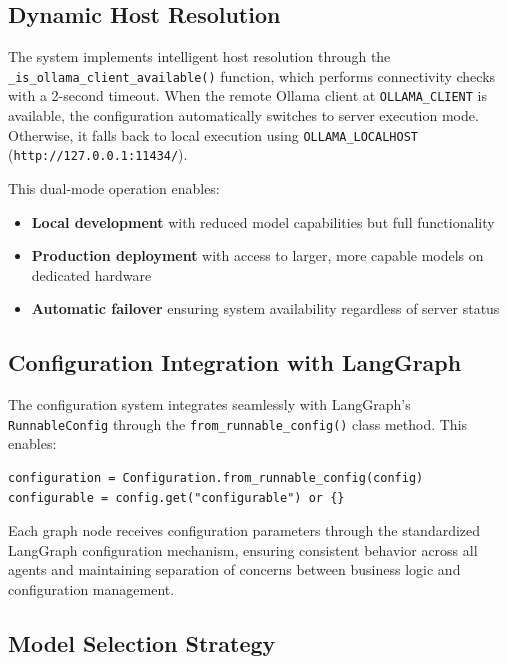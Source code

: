 \documentclass[11pt,a4paper]{report}
\begin{document}
\subsection{Dynamic Host Resolution}

The system implements intelligent host resolution through the \texttt{\_is\_ollama\_client\_available()} function, which performs connectivity checks with a 2-second timeout. When the remote Ollama client at \texttt{OLLAMA\_CLIENT} is available, the configuration automatically switches to server execution mode. Otherwise, it falls back to local execution using \texttt{OLLAMA\_LOCALHOST} (\texttt{http://127.0.0.1:11434/}).

This dual-mode operation enables:
\begin{itemize}
    \item \textbf{Local development} with reduced model capabilities but full functionality
    \item \textbf{Production deployment} with access to larger, more capable models on dedicated hardware
    \item \textbf{Automatic failover} ensuring system availability regardless of server status
\end{itemize}

\subsection{Configuration Integration with LangGraph}

The configuration system integrates seamlessly with LangGraph's \texttt{RunnableConfig} through the \texttt{from\_runnable\_config()} class method. This enables:

\begin{lstlisting}[caption={Configuration integration with LangGraph}]
configuration = Configuration.from_runnable_config(config)
configurable = config.get("configurable") or {}
\end{lstlisting}

Each graph node receives configuration parameters through the standardized LangGraph configuration mechanism, ensuring consistent behavior across all agents and maintaining separation of concerns between business logic and configuration management.

\subsection{Model Selection Strategy}
\end{document}

